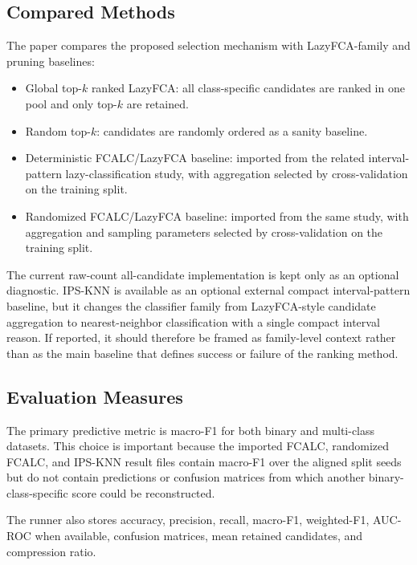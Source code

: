 \documentclass[11pt]{article}
\begin{document}
\subsection{Compared Methods}

The paper compares the proposed selection mechanism with LazyFCA-family and
pruning baselines:

\begin{itemize}[leftmargin=*]
    \item Global top-$k$ ranked LazyFCA: all class-specific candidates are ranked in one
    pool and only top-$k$ are retained.
    \item Random top-$k$: candidates are randomly ordered as a sanity baseline.
    \item Deterministic FCALC/LazyFCA baseline: imported from the related
    interval-pattern lazy-classification study, with aggregation selected by
    cross-validation on the training split.
    \item Randomized FCALC/LazyFCA baseline: imported from the same study, with
    aggregation and sampling parameters selected by cross-validation on the
    training split.
\end{itemize}

The current raw-count all-candidate implementation is kept only as an
optional diagnostic. IPS-KNN is available as an optional external compact
interval-pattern baseline, but it changes the classifier family from
LazyFCA-style candidate aggregation to nearest-neighbor classification with a
single compact interval reason. If reported, it should therefore be framed as
family-level context rather than as the main baseline that defines success or
failure of the ranking method.

\subsection{Evaluation Measures}

The primary predictive metric is macro-F1 for both binary and multi-class
datasets. This choice is important because the imported FCALC, randomized
FCALC, and IPS-KNN result files contain macro-F1 over the aligned split seeds
but do not contain predictions or confusion matrices from which another
binary-class-specific score could be reconstructed.

The runner also stores accuracy, precision, recall, macro-F1, weighted-F1,
AUC-ROC when available, confusion matrices, mean retained candidates, and
compression ratio.
\end{document}
